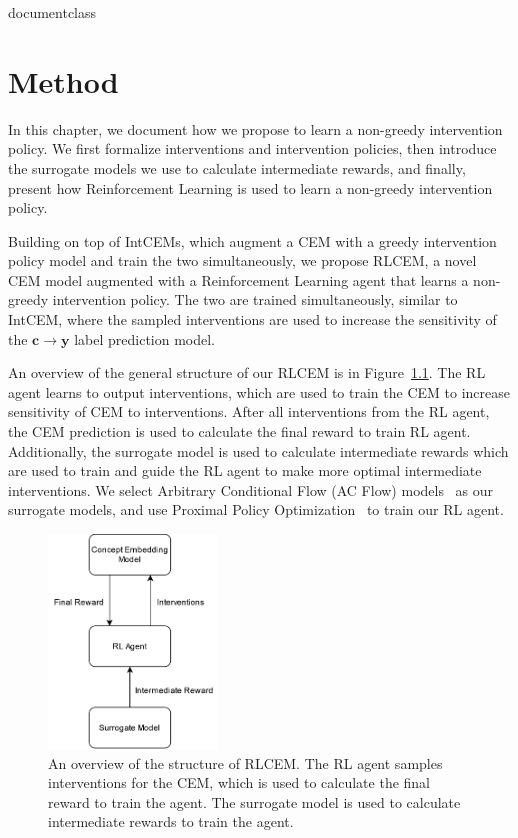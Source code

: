 \csname documentclass

\chapter{Method}


In this chapter, we document how we propose 
to learn a non-greedy intervention policy.
We first
formalize interventions and intervention policies,
then introduce the surrogate models we use
to calculate intermediate rewards,
and finally, present how Reinforcement Learning is used 
to learn a non-greedy intervention policy.

Building on top of IntCEMs, which augment a CEM
with a greedy intervention policy model and train the two simultaneously,
we propose RLCEM,
a novel CEM model augmented with a Reinforcement Learning agent
that learns a non-greedy intervention policy.
The two are trained simultaneously, similar to IntCEM, 
where the sampled interventions are used to increase the sensitivity of the
$\mathbf{c} \to \mathbf{y}$ label prediction model.

An overview of the general structure of our RLCEM is in Figure~\ref{fig:rlcem-overview}.
The RL agent learns to output interventions, which are 
used to train the CEM to increase sensitivity of 
CEM to interventions. After all interventions from the RL agent,
the CEM prediction is used to calculate the final
reward to train RL agent. Additionally, the surrogate model
is used to calculate intermediate rewards which are used to train and guide the 
RL agent to make more optimal intermediate interventions.
We select Arbitrary Conditional Flow (AC Flow)
models~\cite{acflow} as our surrogate models, and use 
Proximal Policy Optimization~\cite{ppo}
to train our RL agent.

\begin{figure}[!ht]
    \centering
    \includegraphics[width=0.4\textwidth]{figs/method/rlcem_overview.png}
    \caption{An overview of the structure of RLCEM. The RL agent samples interventions for the CEM, which is used to calculate
    the final reward to train the agent. The surrogate model is used to calculate intermediate rewards
    to train the agent.}
    \label{fig:rlcem-overview}
\end{figure}

